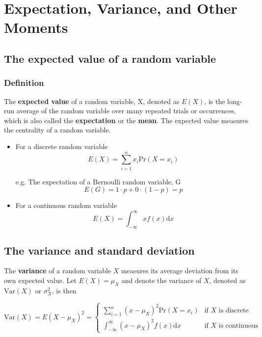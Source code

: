 \documentclass[a4paper,11pt]{article}
\begin{document}
\section{Expectation, Variance, and Other Moments}
\label{sec:org81d0055}

\subsection{The expected value of a random variable}
\label{sec:org5e41539}

\subsubsection*{Definition}
\label{sec:org9e3c167}

The \textbf{expected value} of a random variable, X, denoted as \(E(X)\), is
the long-run average of the random variable over many repeated
trials or occurrences, which is also called the \textbf{expectation} or the
\textbf{mean}. The expected value measures the centrality of a random
variable. 

\begin{itemize}
\item For a discrete random variable
\[ E(X) = \sum_{i=1}^n x_i \mathrm{Pr}(X = x_i) \]

e.g. The expectation of a Bernoulli random variable, G
  \[ E(G) = 1 \cdot p + 0 \cdot (1-p) = p \]

\item For a continuous random variable
\[ E(X) = \int_{-\infty}^{\infty} x f(x) \mathrm{d}x\]
\end{itemize}

\subsection{The variance and standard deviation}
\label{sec:orgebef600}

The \textbf{variance} of a random variable \(X\) measures its average
deviation from its own expected value. Let \(E(X) = \mu_X\) and denote
the variance of \(X\), denoted as \(\mathrm{Var}(X)\) or \(\sigma^2_X\), is then

\begin{equation*}
\mathrm{Var}(X) = E(X-\mu_X)^{2}=
\begin{cases}
\sum_{i=1}^n (x - \mu_X)^{2}\mathrm{Pr}(X = x_i) & \text{if } X \text{ is discrete} \\
\int_{-\infty}^{\infty} (x - \mu_X)^{2}f(x)\mathrm{d} x  & \text{if } X \text{ is continuous}
\end{cases}
\end{equation*}
\end{document}
